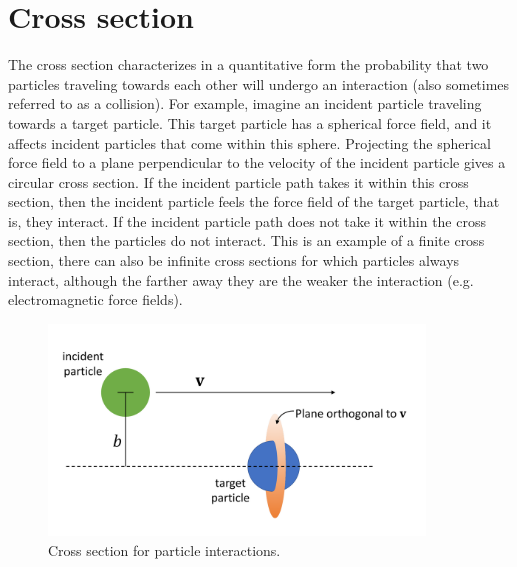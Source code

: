\documentclass[oneside,a4paper,11pt]{report}
\begin{document}
\section{Cross section}
The cross section characterizes in a quantitative form the probability that two particles traveling towards each other will undergo an interaction (also sometimes referred to as a collision). For example, imagine an incident particle traveling towards a target particle. This target particle has a spherical force field, and it affects incident particles that come within this sphere. Projecting the spherical force field to a plane perpendicular to the velocity of the incident particle gives a circular cross section. If the incident particle path takes it within this cross section, then the incident particle feels the force field of the target particle, that is, they interact. If the incident particle path does not take it within the cross section, then the particles do not interact. This is an example of a finite cross section, there can also be infinite cross sections for which particles always interact, although the farther away they are the weaker the interaction (e.g. electromagnetic force fields).

\begin{figure}[ht]
\centering
\includegraphics[width=10cm]{../../images/cross_section.pdf}
\caption{Cross section for particle interactions.}
\label{fig:cross_section}
\end{figure}
\end{document}
